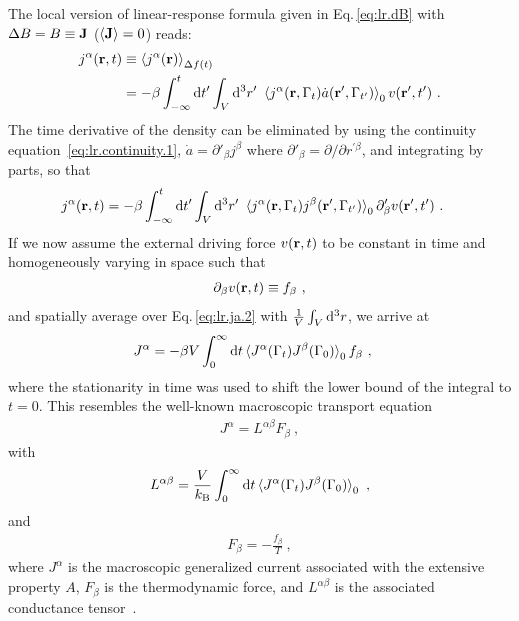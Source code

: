 The local version of linear-response formula given in Eq.\,\eqref{eq:lr.dB} with \mbox{$\Delta B = B \equiv {\bf J}$} ($\braket{{\bf J}} = 0$) reads:
\begin{align}
j^\alpha ({\bf r} , t) 
	& \equiv \braket{j^\alpha ({\bf r})}_{\Delta f (t)} \\
	&= - \beta \int_{-\infty}^{t} {\rm d} t' \int_V {\rm d}^3 r' ~ \braket{
			j^\alpha ({\bf r}, \Gamma_t) \dot{a} ({\bf r}', \Gamma_{t'})
		}_0 v ({\bf r}', t')~.
	\label{eq:lr.ja.1}
\end{align}
The time derivative of the density can be eliminated by using the continuity equation~\eqref{eq:lr.continuity.1}, $\dot a = \partial'_\beta j^\beta$ where $\partial'_\beta = \partial/\partial r^{\prime \beta}$, and integrating by parts, so that
\begin{align}
j^\alpha ({\bf r} , t) 
&= - \beta \int_{-\infty}^{t} {\rm d} t' \int_V {\rm d}^3 r' ~ \braket{
	j^\alpha ({\bf r}, \Gamma_t) j^\beta ({\bf r}', \Gamma_{t'})
}_0 \partial'_\beta v ({\bf r}', t')~.
\label{eq:lr.ja.2}
\end{align}
If we now assume the external driving force $v ({\bf r}, t)$ to be constant in time and homogeneously varying in space such that
\begin{align}
	\partial_\beta v ({\bf r}, t) \equiv f_\beta~,
	\label{eq:lr.force}
\end{align}
and spatially average over Eq.\,\eqref{eq:lr.ja.2} with $\frac{1}{V} \int_V {\rm d}^3 r$, we arrive at
\begin{align}
	J^\alpha 
		&= -\beta V \int_{0}^{\infty} 
		{\rm d} t
		\braket{
		J^\alpha (\Gamma_t) J^\beta (\Gamma_{0})
	}_0 
	f_\beta~,
	\label{eq:lr.J}
\end{align}
where the stationarity in time was used to shift the lower bound of the integral to $t=0$.
This resembles the well-known macroscopic transport equation
\begin{align}
	J^\alpha =  L^{\alpha \beta} F_\beta~,
		\label{eq:lr.LF}
\end{align}
with
\begin{align}
	L^{\alpha \beta}
		= \frac{V}{k_{\rm B}} \int_{0}^{\infty} 
		{\rm d} t \braket{J^\alpha (\Gamma_t) J^\beta (\Gamma_{0})}_0 ~,
	\label{eq:lr.L}
\end{align}
and
\begin{align}
	F_\beta
		= - \frac{f_\beta}{T}~,
	\label{eq:lr.F}
\end{align}
where $J^\alpha$ is the macroscopic generalized current associated with the extensive property $A$, $F_\beta$ is the thermodynamic force, and $L^{\alpha \beta}$ is the associated conductance tensor~\cite{Onsager1931a,Baroni2020a}.

